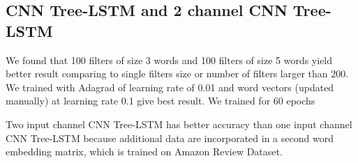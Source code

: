 \subsection{CNN Tree-LSTM and 2 channel CNN Tree-LSTM}
We found that 100 filters of size 3 words and 100 filters of size 5 words yield better result comparing to single filters size or number of filters larger than 200. We trained with Adagrad of learning rate of 0.01 and word vectors (updated manually) at learning rate 0.1 give best result. We trained for 60 epochs

Two input channel CNN Tree-LSTM has better accuracy than one input channel CNN Tree-LSTM because additional data are incorporated in a second word embedding matrix, which is trained on Amazon Review Dataset.







